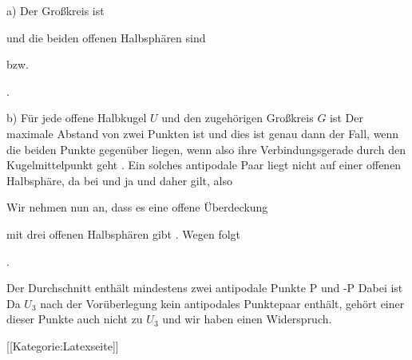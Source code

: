 a) Der Großkreis ist

 {  }

und die beiden offenen Halbsphären sind

 {  }

bzw.

 { . }

b) Für jede offene Halbkugel $U$ und den zugehörigen Großkreis $G$ ist
 Der maximale Abstand von zwei Punkten
 ist
 und dies ist genau dann der Fall, wenn die beiden Punkte gegenüber
 {} {} liegen, wenn also ihre Verbindungsgerade durch den Kugelmittelpunkt geht
 {} {}. Ein solches antipodale Paar liegt nicht auf einer offenen Halbsphäre, da bei
 und
 ja
 und daher
 gilt, also

Wir nehmen nun an, dass es eine offene Überdeckung

 {  }

mit drei offenen Halbsphären
 gibt
 {} {.}
Wegen
 folgt

 { . }

Der Durchschnitt
 enthält mindestens zwei antipodale Punkte
\mathkor {} {P} {und} {-P} {}
Dabei ist
 Da $U_3$ nach der Vorüberlegung kein antipodales Punktepaar enthält, gehört einer dieser Punkte auch nicht zu $U_3$ und wir haben einen Widerspruch.

 [[Kategorie:Latexseite]]
